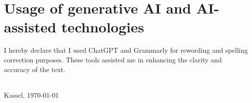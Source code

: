 \section*{Usage of generative AI and AI-assisted technologies}
\label{sec:usage_AI}

I hereby declare that I used ChatGPT and Grammarly for rewording and spelling correction purposes. 
These tools assisted me in enhancing the clarity and accuracy of the text.
\newline

\noindent \underline{ \hspace{6cm}} 
\\ Kassel, \today \hspace{1cm}